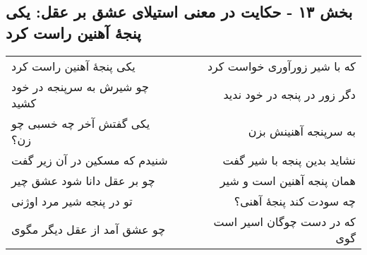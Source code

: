 \begin{center}
\section*{بخش ۱۳ - حکایت در معنی استیلای عشق بر عقل: یکی پنجهٔ آهنین راست کرد}
\label{sec:013}
\begin{longtable}{l p{0.5cm} r}
یکی پنجهٔ آهنین راست کرد
&&
که با شیر زورآوری خواست کرد
\\
چو شیرش به سرپنجه در خود کشید
&&
دگر زور در پنجه در خود ندید
\\
یکی گفتش آخر چه خسبی چو زن؟
&&
به سرپنجه آهنینش بزن
\\
شنیدم که مسکین در آن زیر گفت
&&
نشاید بدین پنجه با شیر گفت
\\
چو بر عقل دانا شود عشق چیر
&&
همان پنجه آهنین است و شیر
\\
تو در پنجه شیر مرد اوژنی
&&
چه سودت کند پنجهٔ آهنی؟
\\
چو عشق آمد از عقل دیگر مگوی
&&
که در دست چوگان اسیر است گوی
\\
\end{longtable}
\end{center}

